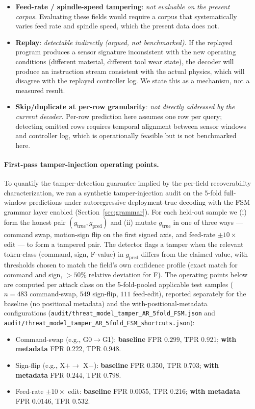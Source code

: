 \documentclass[sensors,article,submit,moreauthors,pdftex]{Definitions/mdpi}
\begin{document}
\begin{itemize}
\item \textbf{Feed-rate / spindle-speed tampering}: \emph{not evaluable on the present corpus.} Evaluating these fields would require a corpus that systematically varies feed rate and spindle speed, which the present data does not.
\item \textbf{Replay}: \emph{detectable indirectly (argued, not benchmarked).} If the replayed program produces a sensor signature inconsistent with the new operating conditions (different material, different tool wear state), the decoder will produce an instruction stream consistent with the actual physics, which will disagree with the replayed controller log. We state this as a mechanism, not a measured result.
\item \textbf{Skip/duplicate at per-row granularity}: \emph{not directly addressed by the current decoder.} Per-row prediction here assumes one row per query; detecting omitted rows requires temporal alignment between sensor windows and controller log, which is operationally feasible but is not benchmarked here.
\end{itemize}

\paragraph{First-pass tamper-injection operating points.} To quantify the tamper-detection guarantee implied by the per-field recoverability characterization, we ran a synthetic tamper-injection audit on the 5-fold full-window predictions under autoregressive deployment-true decoding with the FSM grammar layer enabled (Section~\ref{sec:grammar}). For each held-out sample we (i) form the honest pair $(g_{\text{true}}, g_{\text{pred}})$ and (ii) mutate $g_{\text{true}}$ in one of three ways --- command swap, motion-sign flip on the first signed axis, and feed-rate $\pm 10\times$ edit --- to form a tampered pair. The detector flags a tamper when the relevant token-class (command, sign, F-value) in $g_{\text{pred}}$ differs from the claimed value, with thresholds chosen to match the field's own confidence profile (exact match for command and sign, $>50\%$ relative deviation for F). The operating points below are computed per attack class on the 5-fold-pooled applicable test samples ($n\!=\!483$ command-swap, $549$ sign-flip, $111$ feed-edit), reported separately for the baseline (no positional metadata) and the with-positional-metadata configurations (\texttt{audit/threat\_model\_tamper\_AR\_5fold\_FSM.json} and \texttt{audit/threat\_model\_tamper\_AR\_5fold\_FSM\_shortcuts.json}):
\begin{itemize}
\item Command-swap (e.g., G0$\to$G1): \textbf{baseline} FPR $0.299$, TPR $0.921$; \textbf{with metadata} FPR $0.222$, TPR $0.948$.
\item Sign-flip (e.g., X$+ \to$ X$-$): \textbf{baseline} FPR $0.350$, TPR $0.703$; \textbf{with metadata} FPR $0.244$, TPR $0.798$.
\item Feed-rate $\pm 10\times$ edit: \textbf{baseline} FPR $0.0055$, TPR $0.216$; \textbf{with metadata} FPR $0.0146$, TPR $0.532$.
\end{itemize}
\end{document}
